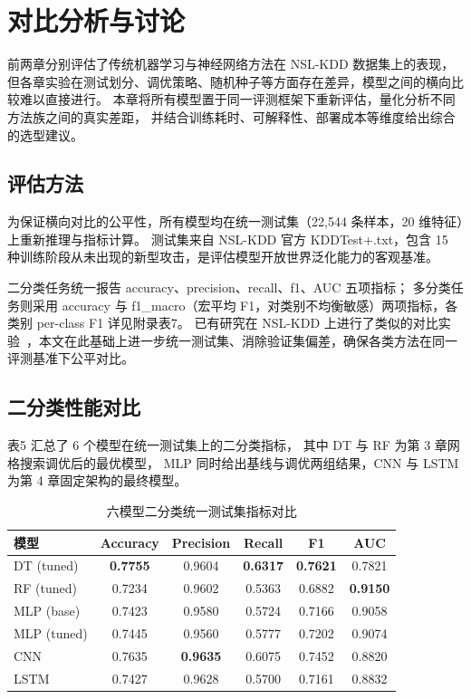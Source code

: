 
\section{对比分析与讨论}

前两章分别评估了传统机器学习与神经网络方法在 NSL-KDD 数据集上的表现，
但各章实验在测试划分、调优策略、随机种子等方面存在差异，模型之间的横向比较难以直接进行。
本章将所有模型置于同一评测框架下重新评估，量化分析不同方法族之间的真实差距，
并结合训练耗时、可解释性、部署成本等维度给出综合的选型建议。

\subsection{评估方法}

为保证横向对比的公平性，所有模型均在统一测试集（22,544 条样本，20 维特征）上重新推理与指标计算。
测试集来自 NSL-KDD 官方 KDDTest+.txt，包含 15 种训练阶段从未出现的新型攻击，是评估模型开放世界泛化能力的客观基准。

二分类任务统一报告 accuracy、precision、recall、f1、AUC 五项指标；
多分类任务则采用 accuracy 与 f1\_macro（宏平均 F1，对类别不均衡敏感）两项指标，各类别 per-class F1 详见附录表7。
已有研究在 NSL-KDD 上进行了类似的对比实验~\cite{udurume2024comparative,candan2025ensemble,sunil2023comparative}，本文在此基础上进一步统一测试集、消除验证集偏差，确保各类方法在同一评测基准下公平对比。

\subsection{二分类性能对比}

表5 汇总了 6 个模型在统一测试集上的二分类指标，
其中 DT 与 RF 为第 3 章网格搜索调优后的最优模型，
MLP 同时给出基线与调优两组结果，CNN 与 LSTM 为第 4 章固定架构的最终模型。

\begin{table}[t]
  \centering
  \caption{六模型二分类统一测试集指标对比}
  \label{tab:binary-comparison}
  \small
  \begin{tabular}{lccccc}
    \toprule
    模型 & Accuracy & Precision & Recall & F1 & AUC \\
    \midrule
    DT (tuned)  & \textbf{0.7755} & 0.9604 & \textbf{0.6317} & \textbf{0.7621} & 0.7821 \\
    RF (tuned)  & 0.7234 & 0.9602 & 0.5363 & 0.6882 & \textbf{0.9150} \\
    MLP (base)  & 0.7423 & 0.9580 & 0.5724 & 0.7166 & 0.9058 \\
    MLP (tuned) & 0.7445 & 0.9560 & 0.5777 & 0.7202 & 0.9074 \\
    CNN         & 0.7635 & \textbf{0.9635} & 0.6075 & 0.7452 & 0.8820 \\
    LSTM        & 0.7427 & 0.9628 & 0.5700 & 0.7161 & 0.8832 \\
    \bottomrule
  \end{tabular}
\end{table}

